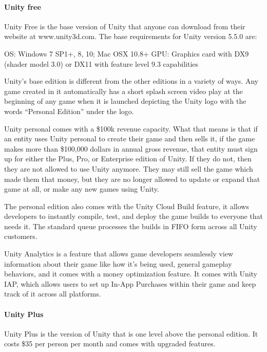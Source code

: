 \documentclass[12pt]{article}
\begin{document}
\autocite{unityTable}

\paragraph{Unity free}\label{unity-free}

Unity Free is the base version of Unity that anyone can download from
their website at www.unity3d.com. The base requirements for Unity
version 5.5.0 are:

OS: Windows 7 SP1+, 8, 10; Mac OSX 10.8+ GPU: Graphics card with DX9
(shader model 3.0) or DX11 with feature level 9.3 capabilities

Unity's base edition is different from the other editions in a variety
of ways. Any game created in it automatically has a short splash screen
video play at the beginning of any game when it is launched depicting
the Unity logo with the words ``Personal Edition'' under the logo.

Unity personal comes with a \$100k revenue capacity. What that means is
that if an entity uses Unity personal to create their game and then
sells it, if the game makes more than \$100,000 dollars in annual gross
revenue, that entity must sign up for either the Plus, Pro, or
Enterprise edition of Unity. If they do not, then they are not allowed
to use Unity anymore. They may still sell the game which made them that
money, but they are no longer allowed to update or expand that game at
all, or make any new games using Unity.

The personal edition also comes with the Unity Cloud Build feature, it
allows developers to instantly compile, test, and deploy the game builds
to everyone that needs it. The standard queue processes the builds in
FIFO form across all Unity customers.

Unity Analytics is a feature that allows game developers seamlessly view
information about their game like how it's being used, general gameplay
behaviors, and it comes with a money optimization feature. It comes with
Unity IAP, which allows users to set up In-App Purchases within their
game and keep track of it across all platforms. \autocite{unityTable}

\paragraph{Unity Plus}\label{unity-plus}

Unity Plus is the version of Unity that is one level above the personal
edition. It costs \$35 per person per month and comes with upgraded
features.
\end{document}

